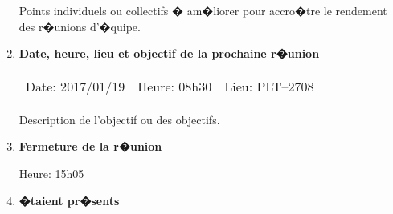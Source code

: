 \documentclass[12pt]{ULojpv}
\begin{document}
\begin{enumerate}
Points individuels ou collectifs � am�liorer pour accro�tre le rendement des r�unions d'�quipe.


\item \textbf{Date, heure, lieu et objectif de la prochaine r�union}

\begin{tabular}{@{}lll}
   Date: 2017/01/19
   & Heure: 08h30
   &  Lieu: PLT--2708
\end{tabular}
\par
Description de l'objectif ou des objectifs.


\item \textbf{Fermeture de la r�union}

Heure: 15h05


\item \textbf{�taient pr�sents}


\end{enumerate}
\end{document}
